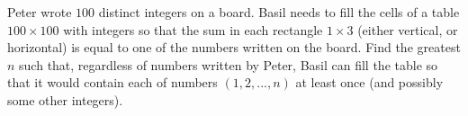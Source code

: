 Peter wrote $100$ distinct integers on a board. Basil needs to fill the cells of a table $100\times{100}$ with integers so that the sum in each rectangle $1\times{3}$ (either vertical, or horizontal) is equal to one of the numbers written on the board. Find the greatest $n$ such that, regardless of numbers written by Peter, Basil can fill the table so that it would contain each of numbers $(1,2,...,n)$ at least once (and possibly some other integers).